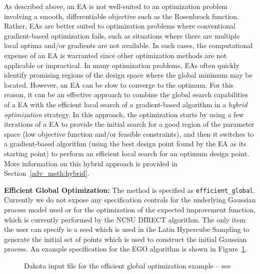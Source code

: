 As described above, an EA is not well-suited to an optimization
problem involving a smooth, differentiable objective such as the
Rosenbrock function. Rather, EAs are better suited to optimization
problems where conventional gradient-based optimization fails, such as
situations where there are multiple local optima and/or gradients are
not available. In such cases, the computational expense of an EA is
warranted since other optimization methods are not applicable or
impractical. In many optimization problems, EAs often quickly identify
promising regions of the design space where the global minimum may be
located. However, an EA can be slow to converge to the optimum. For
this reason, it can be an effective approach to combine the global
search capabilities of a EA with the efficient local search of a
gradient-based algorithm in a \emph{hybrid optimization} strategy. In
this approach, the optimization starts by using a few iterations of a
EA to provide the initial search for a good region of the parameter
space (low objective function and/or feasible constraints), and then
it switches to a gradient-based algorithm (using the best design point
found by the EA as its starting point) to perform an efficient local
search for an optimum design point. More information on this hybrid
approach is provided in Section~\ref{adv_meth:hybrid}.

{\bf Efficient Global Optimization:} The method is specified as
\texttt{efficient\_global}.  Currently we do not expose any
specification controls for the underlying Gaussian process model used
or for the optimization of the expected improvement function, which is
currently performed by the NCSU DIRECT algorithm. The only item the
user can specify is a seed which is used in the Latin Hypercube
Sampling to generate the initial set of points which is used to
construct the initial Gaussian process.  An example specification for
the EGO algorithm is shown in Figure~\ref{opt:methods:gradientfree:global:example:egm_rosen}.
\begin{figure}
  \begin{bigbox}
    \begin{small}
    \end{small}
  \end{bigbox}
  \caption{Dakota input file for the efficient global optimization example --
see \protect{} }
  \label{opt:methods:gradientfree:global:example:egm_rosen}
\end{figure}


